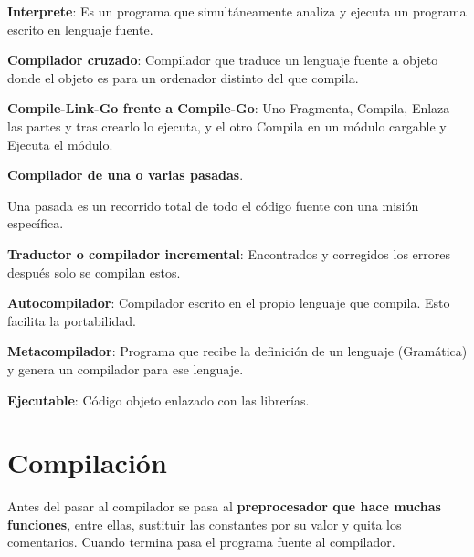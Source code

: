 \documentclass[12pt, twoside, openright]{report} %
\begin{document}
\textbf{Interprete}: Es un programa que simultáneamente analiza y
ejecuta un programa escrito en lenguaje fuente.

\textbf{Compilador cruzado}: Compilador que traduce un lenguaje fuente a
objeto donde el objeto es para un ordenador distinto del que compila.

\textbf{Compile-Link-Go frente a Compile-Go}: Uno Fragmenta, Compila,
Enlaza las partes y tras crearlo lo ejecuta, y el otro Compila en un
módulo cargable y Ejecuta el módulo.

\textbf{Compilador de una o varias pasadas}.

Una pasada es un recorrido total de todo el código fuente con una misión
específica.

\textbf{Traductor o compilador incremental}: Encontrados y corregidos
los errores después solo se compilan estos.

\textbf{Autocompilador}: Compilador escrito en el propio lenguaje que
compila. Esto facilita la portabilidad.

\textbf{Metacompilador}: Programa que recibe la definición de un
lenguaje (Gramática) y genera un compilador para ese lenguaje.

\textbf{Ejecutable}: Código objeto enlazado con las librerías.


\section{Compilación}


\begin{figure}[H]
	{\def\svgwidth{.8\textwidth}
  }
\end{figure}

Antes del pasar al compilador se pasa al \textbf{preprocesador que hace muchas funciones}, entre ellas, sustituir las constantes por su valor y quita los comentarios. Cuando termina pasa el programa fuente al compilador.
\begin{figure}[H]
	{}
\end{figure}
\end{document}
